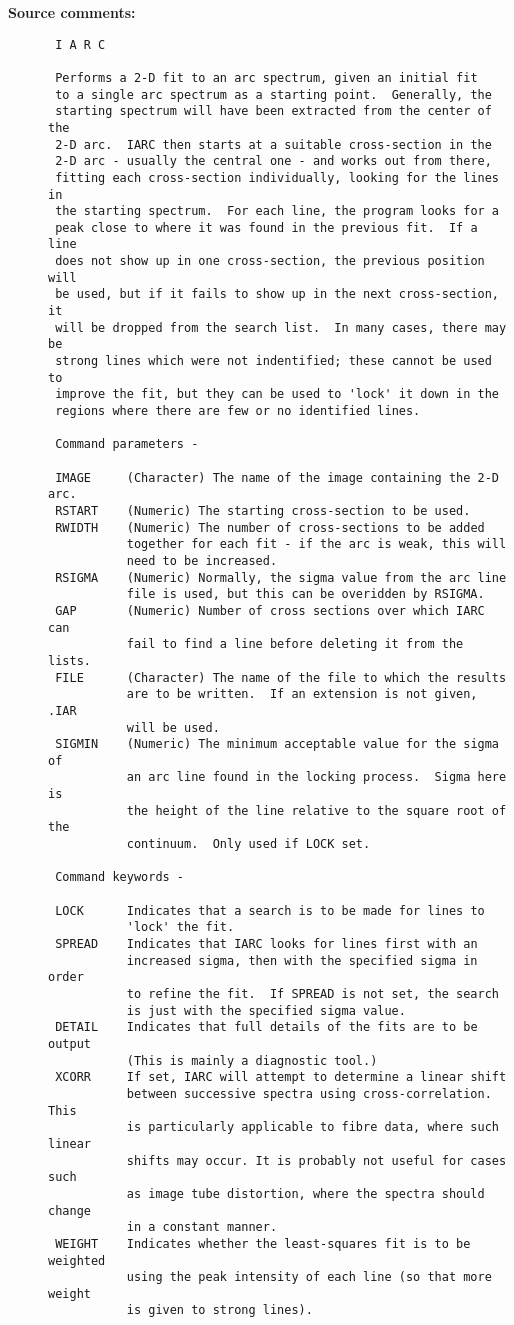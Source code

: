\begin{description}
\item [{\bf Source comments:}]
\begin{verbatim}
 I A R C

 Performs a 2-D fit to an arc spectrum, given an initial fit
 to a single arc spectrum as a starting point.  Generally, the
 starting spectrum will have been extracted from the center of the
 2-D arc.  IARC then starts at a suitable cross-section in the
 2-D arc - usually the central one - and works out from there,
 fitting each cross-section individually, looking for the lines in
 the starting spectrum.  For each line, the program looks for a
 peak close to where it was found in the previous fit.  If a line
 does not show up in one cross-section, the previous position will
 be used, but if it fails to show up in the next cross-section, it
 will be dropped from the search list.  In many cases, there may be
 strong lines which were not indentified; these cannot be used to
 improve the fit, but they can be used to 'lock' it down in the
 regions where there are few or no identified lines.

 Command parameters -

 IMAGE     (Character) The name of the image containing the 2-D arc.
 RSTART    (Numeric) The starting cross-section to be used.
 RWIDTH    (Numeric) The number of cross-sections to be added
           together for each fit - if the arc is weak, this will
           need to be increased.
 RSIGMA    (Numeric) Normally, the sigma value from the arc line
           file is used, but this can be overidden by RSIGMA.
 GAP       (Numeric) Number of cross sections over which IARC can
           fail to find a line before deleting it from the lists.
 FILE      (Character) The name of the file to which the results
           are to be written.  If an extension is not given, .IAR
           will be used.
 SIGMIN    (Numeric) The minimum acceptable value for the sigma of
           an arc line found in the locking process.  Sigma here is
           the height of the line relative to the square root of the
           continuum.  Only used if LOCK set.

 Command keywords -

 LOCK      Indicates that a search is to be made for lines to
           'lock' the fit.
 SPREAD    Indicates that IARC looks for lines first with an
           increased sigma, then with the specified sigma in order
           to refine the fit.  If SPREAD is not set, the search
           is just with the specified sigma value.
 DETAIL    Indicates that full details of the fits are to be output
           (This is mainly a diagnostic tool.)
 XCORR     If set, IARC will attempt to determine a linear shift
           between successive spectra using cross-correlation. This
           is particularly applicable to fibre data, where such linear
           shifts may occur. It is probably not useful for cases such
           as image tube distortion, where the spectra should change
           in a constant manner.
 WEIGHT    Indicates whether the least-squares fit is to be weighted
           using the peak intensity of each line (so that more weight
           is given to strong lines).


\end{verbatim}
\end{description}
